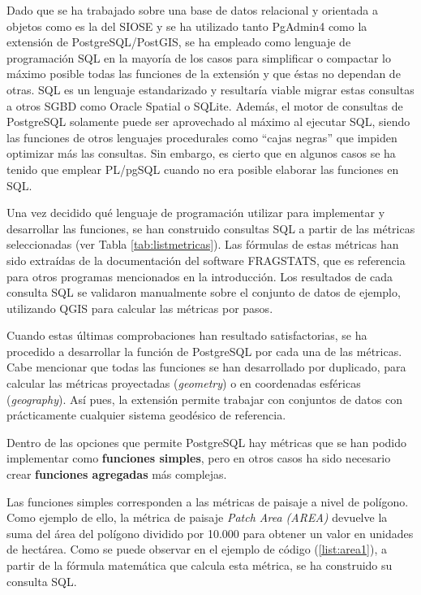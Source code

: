 Dado que se ha trabajado sobre una base de datos relacional y orientada a objetos como es la del SIOSE y se ha utilizado tanto PgAdmin4 como la extensión de PostgreSQL/PostGIS, se ha empleado como lenguaje de programación SQL en la mayoría de los casos para simplificar o compactar lo máximo posible todas las funciones de la extensión y que éstas no dependan de otras. SQL es un lenguaje estandarizado y resultaría viable migrar estas consultas a otros SGBD como Oracle Spatial o SQLite. Además, el motor de consultas de PostgreSQL solamente puede ser aprovechado al máximo al ejecutar SQL, siendo las funciones de otros lenguajes procedurales como ``cajas negras'' que impiden optimizar más las consultas. Sin embargo, es cierto que en algunos casos se ha tenido que emplear PL/pgSQL cuando no era posible elaborar las funciones en SQL.

Una vez decidido qué lenguaje de programación utilizar para implementar y desarrollar las funciones, se han construido consultas SQL a partir de las métricas seleccionadas (ver Tabla \ref{tab:listmetricas}). Las fórmulas de estas métricas han sido extraídas de la documentación del software FRAGSTATS, que es referencia para otros programas mencionados en la introducción. Los resultados de cada consulta SQL se validaron manualmente sobre el conjunto de datos de ejemplo, utilizando QGIS para calcular las métricas por pasos.

Cuando estas últimas comprobaciones han resultado satisfactorias, se ha procedido a desarrollar la función de PostgreSQL por cada una de las métricas. Cabe mencionar que todas las funciones se han desarrollado por duplicado, para calcular las métricas proyectadas (\textit{geometry}) o en coordenadas esféricas (\textit{geography}). Así pues, la extensión permite trabajar con conjuntos de datos con prácticamente cualquier sistema geodésico de referencia.

Dentro de las opciones que permite PostgreSQL hay métricas que se han podido implementar como \textbf{funciones simples}, pero en otros casos ha sido necesario crear \textbf{funciones agregadas} más complejas.

Las funciones simples corresponden a las métricas de paisaje a nivel de polígono. Como ejemplo de ello, la métrica de paisaje \textit{Patch Area (AREA)} devuelve la suma del área del polígono dividido por 10.000 para obtener un valor en unidades de hectárea. Como se puede observar en el ejemplo de código (\ref{list:area1}), a partir de la fórmula matemática que calcula esta métrica, se ha construido su consulta SQL.

